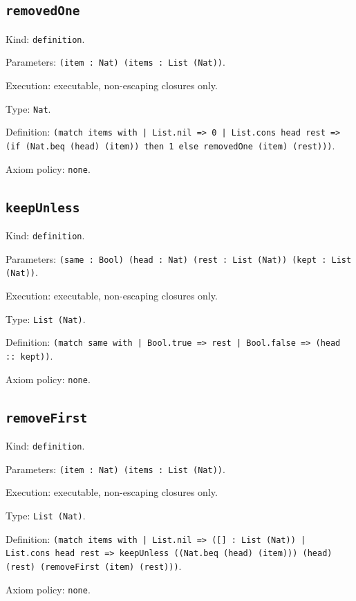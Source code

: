\documentclass[11pt]{article}
\begin{document}
\subsection*{\texttt{removedOne}}
\noindent Kind: \texttt{definition}.\par
\noindent Parameters: \texttt{(item : Nat) (items : List (Nat))}.\par
\noindent Execution: executable, non-escaping closures only.\par
\noindent Type: \texttt{Nat}.\par
\noindent Definition: \texttt{(match items with | List.nil => 0 | List.cons head rest => (if (Nat.beq (head) (item)) then 1 else removedOne (item) (rest)))}.\par
\noindent Axiom policy: \texttt{none}.\par
\subsection*{\texttt{keepUnless}}
\noindent Kind: \texttt{definition}.\par
\noindent Parameters: \texttt{(same : Bool) (head : Nat) (rest : List (Nat)) (kept : List (Nat))}.\par
\noindent Execution: executable, non-escaping closures only.\par
\noindent Type: \texttt{List (Nat)}.\par
\noindent Definition: \texttt{(match same with | Bool.true => rest | Bool.false => (head :: kept))}.\par
\noindent Axiom policy: \texttt{none}.\par
\subsection*{\texttt{removeFirst}}
\noindent Kind: \texttt{definition}.\par
\noindent Parameters: \texttt{(item : Nat) (items : List (Nat))}.\par
\noindent Execution: executable, non-escaping closures only.\par
\noindent Type: \texttt{List (Nat)}.\par
\noindent Definition: \texttt{(match items with | List.nil => ([] : List (Nat)) | List.cons head rest => keepUnless ((Nat.beq (head) (item))) (head) (rest) (removeFirst (item) (rest)))}.\par
\noindent Axiom policy: \texttt{none}.\par
\end{document}
